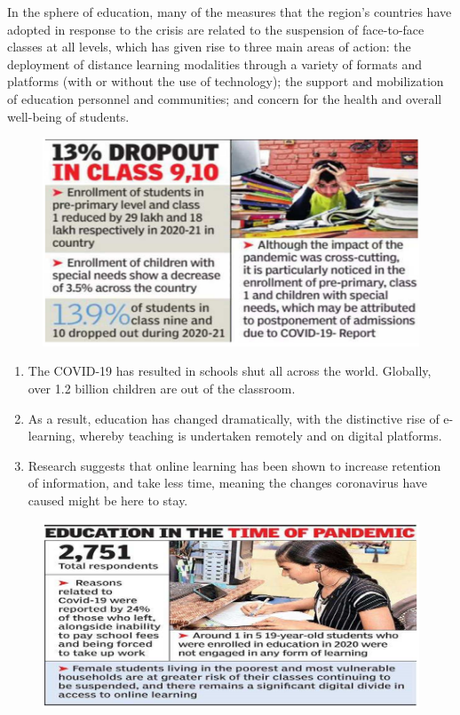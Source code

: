 \documentclass[11pt]{scrartcl}
\begin{document}
	In the sphere of education, many of the measures that the region’s countries have adopted in response to the crisis are related to the suspension of face-to-face classes at all levels, which has given rise to three main areas of action: the deployment of distance learning modalities through a variety of formats and platforms (with or without the use of technology); the support and mobilization of education personnel and communities; and concern for the health and overall well-being of students.
	
	\begin{figure}[H]
		\centering
		\includegraphics[scale=0.6]{pic1}
	\end{figure}

	\begin{enumerate}[$\bullet$]
		\item The COVID-19 has resulted in schools shut all across the world. Globally, over 1.2 billion children are out of the classroom.
		
		\item As a result, education has changed dramatically, with the distinctive rise of e-learning, whereby teaching is undertaken remotely and on digital platforms.
		
		\item Research suggests that online learning has been shown to increase retention of information, and take less time, meaning the changes coronavirus have caused might be here to stay.
	\end{enumerate}
	
	\begin{figure}[H]
		\centering
		\includegraphics[scale=0.6]{pic2}
	\end{figure}
		
\end{document}
